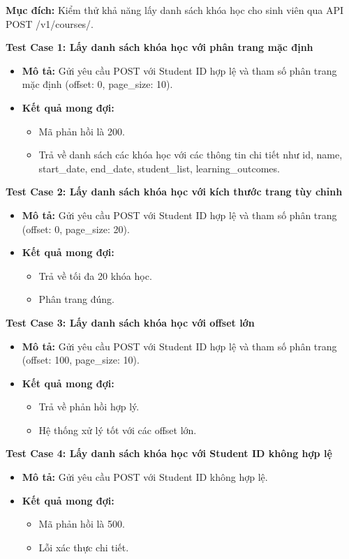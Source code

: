 
\textbf{Mục đích:} Kiểm thử khả năng lấy danh sách khóa học cho sinh viên qua API POST /v1/courses/.

\textbf{Test Case 1: Lấy danh sách khóa học với phân trang mặc định}
\begin{itemize}
    \item \textbf{Mô tả:} Gửi yêu cầu POST với Student ID hợp lệ và tham số phân trang mặc định (offset: 0, page\_size: 10).
    \item \textbf{Kết quả mong đợi:}
    \begin{itemize}
        \item Mã phản hồi là 200.
        \item Trả về danh sách các khóa học với các thông tin chi tiết như id, name, start\_date, end\_date, student\_list, learning\_outcomes.
    \end{itemize}
\end{itemize}

\textbf{Test Case 2: Lấy danh sách khóa học với kích thước trang tùy chỉnh}
\begin{itemize}
    \item \textbf{Mô tả:} Gửi yêu cầu POST với Student ID hợp lệ và tham số phân trang (offset: 0, page\_size: 20).
    \item \textbf{Kết quả mong đợi:}
    \begin{itemize}
        \item Trả về tối đa 20 khóa học.
        \item Phân trang đúng.
    \end{itemize}
\end{itemize}

\textbf{Test Case 3: Lấy danh sách khóa học với offset lớn}
\begin{itemize}
    \item \textbf{Mô tả:} Gửi yêu cầu POST với Student ID hợp lệ và tham số phân trang (offset: 100, page\_size: 10).
    \item \textbf{Kết quả mong đợi:}
    \begin{itemize}
        \item Trả về phản hồi hợp lý.
        \item Hệ thống xử lý tốt với các offset lớn.
    \end{itemize}
\end{itemize}

\textbf{Test Case 4: Lấy danh sách khóa học với Student ID không hợp lệ}
\begin{itemize}
    \item \textbf{Mô tả:} Gửi yêu cầu POST với Student ID không hợp lệ.
    \item \textbf{Kết quả mong đợi:}
    \begin{itemize}
        \item Mã phản hồi là 500.
        \item Lỗi xác thực chi tiết.
    \end{itemize}
\end{itemize}

